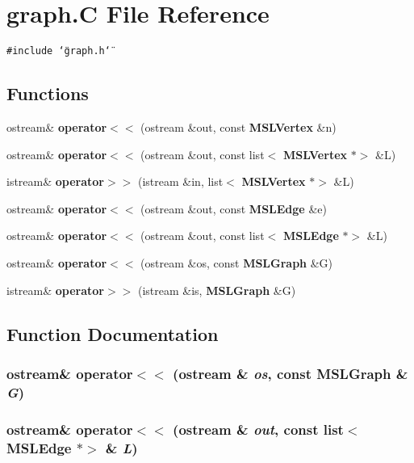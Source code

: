 \section{graph.C File Reference}
\label{graph_C}
{\tt \#include \char`\"{}graph.h\char`\"{}}\par
\subsection*{Functions}
\begin{CompactItemize}
\item 
ostream\& {\bf operator$<$$<$} (ostream \&out, const {\bf MSLVertex} \&n)
\item 
ostream\& {\bf operator$<$$<$} (ostream \&out, const list$<$ {\bf MSLVertex} $\ast$$>$ \&L)
\item 
istream\& {\bf operator$>$$>$} (istream \&in, list$<$ {\bf MSLVertex} $\ast$$>$ \&L)
\item 
ostream\& {\bf operator$<$$<$} (ostream \&out, const {\bf MSLEdge} \&e)
\item 
ostream\& {\bf operator$<$$<$} (ostream \&out, const list$<$ {\bf MSLEdge} $\ast$$>$ \&L)
\item 
ostream\& {\bf operator$<$$<$} (ostream \&os, const {\bf MSLGraph} \&G)
\item 
istream\& {\bf operator$>$$>$} (istream \&is, {\bf MSLGraph} \&G)
\end{CompactItemize}


\subsection{Function Documentation}
\subsubsection{\setlength{\rightskip}{0pt plus 5cm}ostream\& operator$<$$<$ (ostream \& {\em os}, const {\bf MSLGraph} \& {\em G})}\label{graph_C_a5}


\subsubsection{\setlength{\rightskip}{0pt plus 5cm}ostream\& operator$<$$<$ (ostream \& {\em out}, const list$<$ {\bf MSLEdge} $\ast$$>$ \& {\em L})}\label{graph_C_a4}


